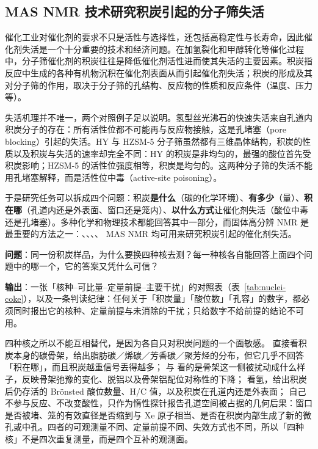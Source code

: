 \subsection{MAS NMR 技术研究积炭引起的分子筛失活}

催化工业对催化剂的要求不只是活性与选择性，还包括高稳定性与长寿命，因此催化剂失活是一个十分重要的技术和经济问题。在加氢裂化和甲醇转化等催化过程中，分子筛催化剂的积炭往往是降低催化剂活性进而使其失活的主要因素。积炭指反应中生成的各种有机物沉积在催化剂表面从而引起催化剂失活；积炭的形成及其对分子筛的作用，取决于分子筛的孔结构、反应物的性质和反应条件（温度、压力等）。

失活机理并不唯一，两个对照例子足以说明。氢型丝光沸石的快速失活来自孔道内积炭分子的存在：所有活性位都不可能再与反应物接触，这是孔堵塞（pore blocking）引起的失活。HY 与 HZSM-5 分子筛虽然都有三维晶体结构，积炭的性质以及积炭与失活的速率却完全不同：HY 的积炭是非均匀的，最强的酸位首先受积炭影响；HZSM-5 的活性位强度相等，积炭是均匀的。这两种分子筛的失活不能用孔堵塞解释，而是活性位中毒（active-site poisoning）。

于是研究任务可以拆成四个问题：积炭\textbf{是什么}（碳的化学环境）、\textbf{有多少}（量）、\textbf{积在哪}（孔道内还是外表面、窗口还是笼内）、\textbf{以什么方式}让催化剂失活（酸位中毒还是孔堵塞）。多种化学和物理技术都能回答其中一部分，而固体高分辨 NMR 是最重要的方法之一：、、、、 MAS NMR 均可用来研究积炭引起的催化剂失活。

\begin{probout}
\textbf{问题}：同一份积炭样品，为什么要换四种核去测？每一种核各自能回答上面四个问题中的哪一个，它的答案又凭什么可信？

\textbf{输出}：一张「核种--可比量--定量前提--主要干扰」的对照表（表~\ref{tab:nuclei-coke}），以及一条判读纪律：任何关于「积炭量」「酸位数」「孔容」的数字，都必须同时报出它的核种、定量前提与未消除的干扰；只给数字不给前提的结论不可用。
\end{probout}

四种核之所以不能互相替代，是因为各自只对积炭问题的一个面敏感。 直接看积炭本身的碳骨架，给出脂肪碳／烯碳／芳香碳／聚芳烃的分布，但它几乎不回答「积在哪」，而且积炭越重信号丢得越多； 与  看的是骨架这一侧被扰动成什么样子，反映骨架弛豫的变化、脱铝以及骨架铝配位对称性的下降； 看氢，给出积炭后仍存活的 Brönsted 酸位数量、H/C 值，以及积炭在孔道内还是外表面； 自己不参与反应、不改变酸性，只作为惰性探针报告孔道空间被占据的几何后果：窗口是否被堵、笼的有效直径是否缩到与 Xe 原子相当、是否在积炭内部生成了新的微孔或中孔。四者的可观测量不同、定量前提不同、失效方式也不同，所以「四种核」不是四次重复测量，而是四个互补的观测面。

